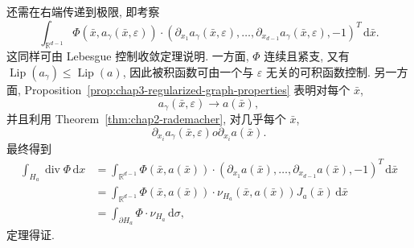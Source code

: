 \begin{Proof}
还需在右端传递到极限, 即考察
\[
 \int_{\mathbb R^{d-1}}\Phi(\bar x,a_\gamma(\bar x,\varepsilon))\cdot
 (\partial_{x_1}a_\gamma(\bar x,\varepsilon),\ldots,
 \partial_{x_{d-1}}a_\gamma(\bar x,\varepsilon),-1)^T\,\mathrm d\bar x.
\]
这同样可由 Lebesgue 控制收敛定理说明. 一方面, $\Phi$ 连续且紧支, 又有 $\operatorname{Lip}(a_\gamma)\leq\operatorname{Lip}(a)$, 因此被积函数可由一个与 $\varepsilon$ 无关的可积函数控制. 另一方面, Proposition~\ref{prop:chap3-regularized-graph-properties} 表明对每个 $\bar x$,
\[
 a_\gamma(\bar x,\varepsilon)\to a(\bar x),
\]
并且利用 Theorem~\ref{thm:chap2-rademacher}, 对几乎每个 $\bar x$,
\[
 \partial_{x_i}a_\gamma(\bar x,\varepsilon)	o\partial_{x_i}a(\bar x).
\]
最终得到
\[
\begin{aligned}
 \int_{H_a}\operatorname{div}\Phi\,\mathrm dx
 &=\int_{\mathbb R^{d-1}}\Phi(\bar x,a(\bar x))\cdot
 (\partial_{x_1}a(\bar x),\ldots,\partial_{x_{d-1}}a(\bar x),-1)^T\,\mathrm d\bar x\\
 &=\int_{\mathbb R^{d-1}}\Phi(\bar x,a(\bar x))\cdot
 \nu_{H_a}(\bar x,a(\bar x))J_a(\bar x)\,\mathrm d\bar x\\
 &=\int_{\partial H_a}\Phi\cdot\nu_{H_a}\,\mathrm d\sigma,
\end{aligned}
\]
定理得证.
\end{Proof}
